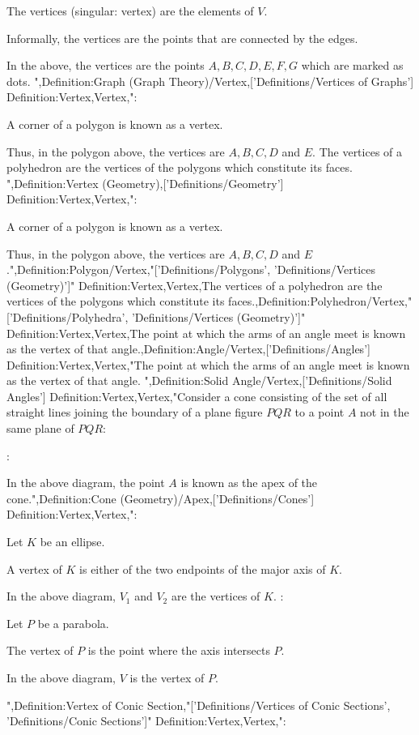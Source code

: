 The vertices (singular: vertex) are the elements of $V$.

Informally, the vertices are the points that are connected by the edges.


In the above, the vertices are the points $A, B, C, D, E, F, G$ which are marked as dots.
",Definition:Graph (Graph Theory)/Vertex,['Definitions/Vertices of Graphs']
Definition:Vertex,Vertex,":

A corner of a polygon is known as a vertex.

Thus, in the polygon above, the vertices are $A, B, C, D$ and $E$.
The vertices of a polyhedron are the vertices of the polygons which constitute its faces.
",Definition:Vertex (Geometry),['Definitions/Geometry']
Definition:Vertex,Vertex,":

A corner of a polygon is known as a vertex.

Thus, in the polygon above, the vertices are $A, B, C, D$ and $E$.",Definition:Polygon/Vertex,"['Definitions/Polygons', 'Definitions/Vertices (Geometry)']"
Definition:Vertex,Vertex,The vertices of a polyhedron are the vertices of the polygons which constitute its faces.,Definition:Polyhedron/Vertex,"['Definitions/Polyhedra', 'Definitions/Vertices (Geometry)']"
Definition:Vertex,Vertex,The point at which the arms of an angle meet is known as the vertex of that angle.,Definition:Angle/Vertex,['Definitions/Angles']
Definition:Vertex,Vertex,"The point at which the arms of an angle meet is known as the vertex of that angle.
",Definition:Solid Angle/Vertex,['Definitions/Solid Angles']
Definition:Vertex,Vertex,"Consider a cone consisting of the set of all straight lines joining the boundary of a plane figure $PQR$ to a point $A$ not in the same plane of $PQR$:


:


In the above diagram, the point $A$ is known as the apex of the cone.",Definition:Cone (Geometry)/Apex,['Definitions/Cones']
Definition:Vertex,Vertex,":


Let $K$ be an ellipse.

A vertex of $K$ is either of the two endpoints of the major axis of $K$.


In the above diagram, $V_1$ and $V_2$ are the vertices of $K$.
:


Let $P$ be a parabola.

The vertex of $P$ is the point where the axis intersects $P$.


In the above diagram, $V$ is the vertex of $P$.

",Definition:Vertex of Conic Section,"['Definitions/Vertices of Conic Sections', 'Definitions/Conic Sections']"
Definition:Vertex,Vertex,":



